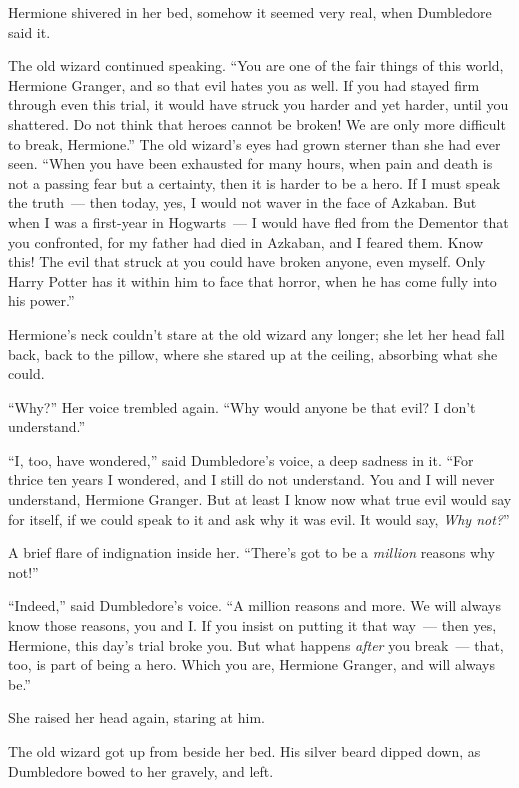 Hermione shivered in her bed, somehow it seemed very real, when Dumbledore said it.

The old wizard continued speaking. ``You are one of the fair things of this world, Hermione Granger, and so that evil hates you as well. If you had stayed firm through even this trial, it would have struck you harder and yet harder, until you shattered. Do not think that heroes cannot be broken! We are only more difficult to break, Hermione.'' The old wizard's eyes had grown sterner than she had ever seen. ``When you have been exhausted for many hours, when pain and death is not a passing fear but a certainty, then it is harder to be a hero. If I must speak the truth~--- then today, yes, I would not waver in the face of Azkaban. But when I was a first-year in Hogwarts~--- I would have fled from the Dementor that you confronted, for my father had died in Azkaban, and I feared them. Know this! The evil that struck at you could have broken anyone, even myself. Only Harry Potter has it within him to face that horror, when he has come fully into his power.''

Hermione's neck couldn't stare at the old wizard any longer; she let her head fall back, back to the pillow, where she stared up at the ceiling, absorbing what she could.

``Why?'' Her voice trembled again. ``Why would anyone be that evil? I don't understand.''

``I, too, have wondered,'' said Dumbledore's voice, a deep sadness in it. ``For thrice ten years I wondered, and I still do not understand. You and I will never understand, Hermione Granger. But at least I know now what true evil would say for itself, if we could speak to it and ask why it was evil. It would say, \emph{Why not?}''

A brief flare of indignation inside her. ``There's got to be a \emph{million} reasons why not!''

``Indeed,'' said Dumbledore's voice. ``A million reasons and more. We will always know those reasons, you and I. If you insist on putting it that way~--- then yes, Hermione, this day's trial broke you. But what happens \emph{after} you break~--- that, too, is part of being a hero. Which you are, Hermione Granger, and will always be.''

She raised her head again, staring at him.

The old wizard got up from beside her bed. His silver beard dipped down, as Dumbledore bowed to her gravely, and left.

